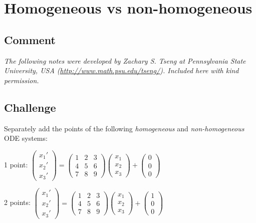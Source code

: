 \section{Homogeneous vs non-homogeneous}

\subsection*{Comment}
\emph{The following notes were developed by Zachary S. Tseng at Pennsylvania State University, USA (\url{http://www.math.psu.edu/tseng/}). Included here with kind permission.}



\subsection*{Challenge}
Separately add the points of the following \emph{homogeneous} and \emph{non-homogeneous} ODE systems:

1 point:
$\displaystyle
\left(
    \begin{array}{c}
        x_1' \\
        x_2' \\
        x_3'
    \end{array}
\right)
=
\left(
    \begin{array}{ccc}
        1 & 2 & 3 \\
        4 & 5 & 6 \\
        7 & 8 & 9
    \end{array}
\right)
\left(
    \begin{array}{c}
        x_1 \\
        x_2 \\
        x_3
    \end{array}
\right)
+
\left(
    \begin{array}{c}
        0 \\
        0 \\
        0
    \end{array}
\right)
$

2 points:
$\displaystyle
\left(
    \begin{array}{c}
        x_1' \\
        x_2' \\
        x_3'
    \end{array}
\right)
=
\left(
    \begin{array}{ccc}
        1 & 2 & 3 \\
        4 & 5 & 6 \\
        7 & 8 & 9
    \end{array}
\right)
\left(
    \begin{array}{c}
        x_1 \\
        x_2 \\
        x_3
    \end{array}
\right)
+
\left(
    \begin{array}{c}
        1 \\
        0 \\
        0
    \end{array}
\right)$

